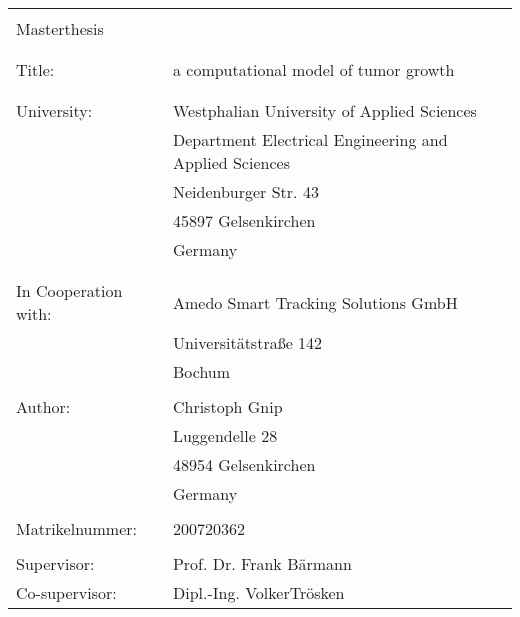 \begin{longtable}{p{4cm}p{11cm}}
{} & {}\\
\Large{Masterthesis} & {}\\
{}  & {}\\
{}   & {}\\
Title: & a computational model of tumor growth\\
{}  & {}\\
{} & {}\\
University:                 & Westphalian University of Applied Sciences \\
{} & Department Electrical Engineering and Applied Sciences \\
{}                          & Neidenburger Str. 43 \\
{}                          & 45897 Gelsenkirchen \\
{}                          & Germany \\
{}                          & {}\\
{}                          & {}\\
In Cooperation with:        & Amedo Smart Tracking Solutions GmbH\\
{}                          & Universitätstraße 142 \\
{}                          & Bochum \\
{}                          & {}\\
Author:                     & Christoph Gnip \\
{}                          & Luggendelle 28 \\
{}                          & 48954 Gelsenkirchen \\
{}                          & Germany \\
{}                          & {}\\
Matrikelnummer:			& 200720362 \\
{}                          & {}\\
Supervisor:                 & Prof. Dr. Frank Bärmann \\
Co-supervisor:              & Dipl.-Ing. VolkerTrösken\\
\end{longtable}

\newpage